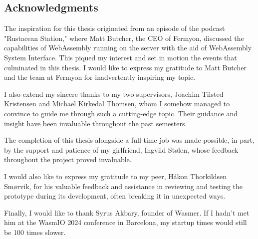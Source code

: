 \documentclass[
  table]{report}
\begin{document}
\begin{center}
\begin{minipage}{0.75\textwidth}

\chapter*{Acknowledgments}

The inspiration for this thesis originated from an episode of the podcast
"Rustacean Station," where Matt Butcher, the CEO of Fermyon, discussed the
capabilities of WebAssembly running on the server with the aid of WebAssembly
System Interface. This piqued my interest and set in motion the events that
culminated in this thesis. I would like to express my gratitude to Matt Butcher
and the team at Fermyon for inadvertently inspiring my topic.

\vspace{0.25cm}

I also extend my sincere thanks to my two supervisors, Joachim Tilsted
Kristensen and Michael Kirkedal Thomsen, whom I somehow managed to convince to
guide me through such a cutting-edge topic. Their guidance and insight have been
invaluable throughout the past semesters.

\vspace{0.25cm}

The completion of this thesis alongside a full-time job was made possible, in
part, by the support and patience of my girlfriend, Ingvild Stølen, whose
feedback throughout the project proved invaluable.

\vspace{0.25cm}

I would also like to express my gratitude to my peer, Håkon Thorkildsen Smørvik,
for his valuable feedback and assistance in reviewing and testing the prototype
during its development, often breaking it in unexpected ways.

\vspace{0.25cm}

Finally, I would like to thank Syrus Akbary, founder of Wasmer. If I hadn't met
him at the WasmIO 2024 conference in Barcelona, my startup times would still be
100 times slower.

\end{minipage}
\end{center}
\vspace*{\fill}

\newpage
\end{document}

